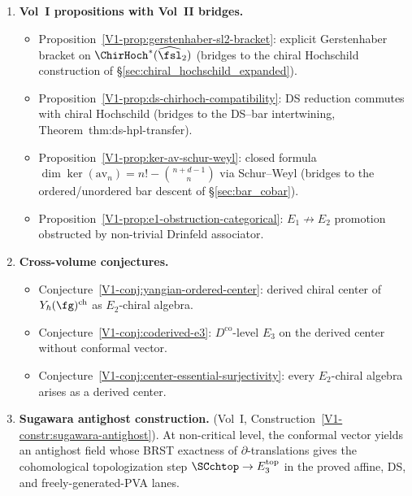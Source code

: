 \begin{enumerate}[resume]
\item \textbf{Vol~I propositions with Vol~II bridges.}
 \begin{itemize}
 \item Proposition~\ref*{V1-prop:gerstenhaber-sl2-bracket}:
 explicit Gerstenhaber bracket on
 $\ChirHoch^*(\widehat{\fsl}_2)$
 (bridges to the chiral Hochschild construction of
 \S\ref{sec:chiral_hochschild_expanded}).
 \item Proposition~\ref*{V1-prop:ds-chirhoch-compatibility}:
 DS reduction commutes with chiral Hochschild
 (bridges to the DS--bar intertwining,
 Theorem~\textup{thm:ds-hpl-transfer}).
 \item Proposition~\ref*{V1-prop:ker-av-schur-weyl}:
 closed formula $\dim\ker(\mathrm{av}_n)
 = n! - \binom{n{+}d{-}1}{n}$ via Schur--Weyl
 (bridges to the ordered/unordered bar descent
 of \S\ref{sec:bar_cobar}).
 \item Proposition~\ref*{V1-prop:e1-obstruction-categorical}:
 $E_1 \not\to E_2$ promotion obstructed by
 non-trivial Drinfeld associator.
 \end{itemize}

\item \textbf{Cross-volume conjectures.}
 \begin{itemize}
 \item Conjecture~\ref*{V1-conj:yangian-ordered-center}:
 derived chiral center of $Y_\hbar(\fg)^{\mathrm{ch}}$
 as $E_2$-chiral algebra.
 \item Conjecture~\ref*{V1-conj:coderived-e3}:
 $D^{\mathrm{co}}$-level $E_3$ on the derived center
 without conformal vector.
 \item Conjecture~\ref*{V1-conj:center-essential-surjectivity}:
 every $E_2$-chiral algebra arises as a derived center.
 \end{itemize}

\item \textbf{Sugawara antighost construction.}
 (Vol~I, Construction~\ref*{V1-constr:sugawara-antighost}).
 At non-critical level, the conformal vector yields an
 antighost field whose BRST exactness of $\partial$-translations
 gives the cohomological topologization step
 $\SCchtop \to E_3^{\mathrm{top}}$ in the proved affine, DS, and
 freely-generated-PVA lanes.
\end{enumerate}
